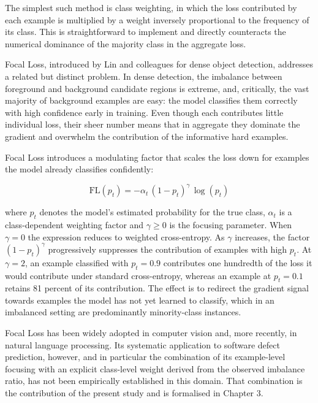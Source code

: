 \documentclass[12pt,a4paper,oneside]{report}
\begin{document}
The simplest such method is class weighting, in which the loss contributed by each example is multiplied by a weight inversely proportional to the frequency of its class. This is straightforward to implement and directly counteracts the numerical dominance of the majority class in the aggregate loss.

Focal Loss, introduced by Lin and colleagues \cite{lin2017} for dense object detection, addresses a related but distinct problem. In dense detection, the imbalance between foreground and background candidate regions is extreme, and, critically, the vast majority of background examples are easy: the model classifies them correctly with high confidence early in training. Even though each contributes little individual loss, their sheer number means that in aggregate they dominate the gradient and overwhelm the contribution of the informative hard examples.

Focal Loss introduces a modulating factor that scales the loss down for examples the model already classifies confidently:

\begin{equation}
\mathrm{FL}(p_t) = -\alpha_t \, (1 - p_t)^{\gamma} \, \log(p_t)
\label{eq:focal}
\end{equation}

where $p_t$ denotes the model's estimated probability for the true class, $\alpha_t$ is a class-dependent weighting factor and $\gamma \geq 0$ is the focusing parameter. When $\gamma = 0$ the expression reduces to weighted cross-entropy. As $\gamma$ increases, the factor $(1 - p_t)^{\gamma}$ progressively suppresses the contribution of examples with high $p_t$. At $\gamma = 2$, an example classified with $p_t = 0.9$ contributes one hundredth of the loss it would contribute under standard cross-entropy, whereas an example at $p_t = 0.1$ retains 81 percent of its contribution. The effect is to redirect the gradient signal towards examples the model has not yet learned to classify, which in an imbalanced setting are predominantly minority-class instances.

Focal Loss has been widely adopted in computer vision and, more recently, in natural language processing. Its systematic application to software defect prediction, however, and in particular the combination of its example-level focusing with an explicit class-level weight derived from the observed imbalance ratio, has not been empirically established in this domain. That combination is the contribution of the present study and is formalised in Chapter 3.
\end{document}
